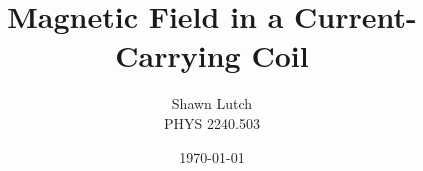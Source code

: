 \documentclass[12pt,letterpaper,titlepage]{report}
\newcommand{\myTitle}{Magnetic Field in a Current-Carrying Coil}
\newcommand{\myName}{Shawn Lutch}
\newcommand{\myPeriod}{PHYS 2240.503}
\begin{document}

\title{\myTitle{}}
\author{\myName{} \\ \myPeriod{}}
\date{\today}
\maketitle
\end{document}
